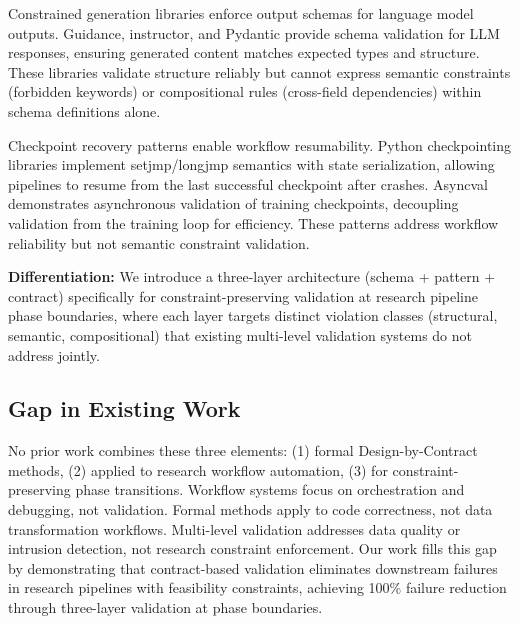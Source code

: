 Constrained generation libraries enforce output schemas for language model outputs. Guidance, instructor, and Pydantic provide schema validation for LLM responses, ensuring generated content matches expected types and structure. These libraries validate structure reliably but cannot express semantic constraints (forbidden keywords) or compositional rules (cross-field dependencies) within schema definitions alone.

Checkpoint recovery patterns enable workflow resumability. Python checkpointing libraries implement setjmp/longjmp semantics with state serialization, allowing pipelines to resume from the last successful checkpoint after crashes. Asyncval demonstrates asynchronous validation of training checkpoints, decoupling validation from the training loop for efficiency. These patterns address workflow reliability but not semantic constraint validation.

\textbf{Differentiation:} We introduce a three-layer architecture (schema + pattern + contract) specifically for constraint-preserving validation at research pipeline phase boundaries, where each layer targets distinct violation classes (structural, semantic, compositional) that existing multi-level validation systems do not address jointly.

\subsection{Gap in Existing Work}

No prior work combines these three elements: (1) formal Design-by-Contract methods, (2) applied to research workflow automation, (3) for constraint-preserving phase transitions. Workflow systems focus on orchestration and debugging, not validation. Formal methods apply to code correctness, not data transformation workflows. Multi-level validation addresses data quality or intrusion detection, not research constraint enforcement. Our work fills this gap by demonstrating that contract-based validation eliminates downstream failures in research pipelines with feasibility constraints, achieving 100\% failure reduction through three-layer validation at phase boundaries.
